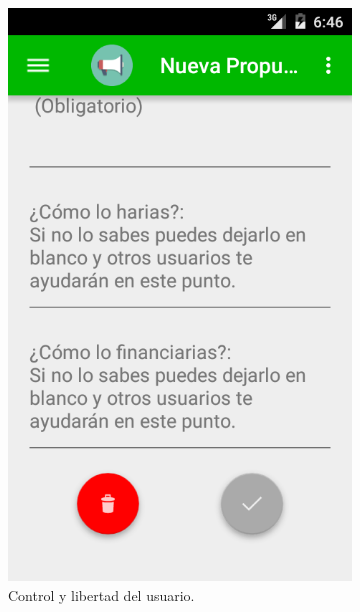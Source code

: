 \begin{figure}[!]
\begin{subfigure}[b]{0.3\textwidth}
                \includegraphics[width=\textwidth]{Media/Captures/principio03.png}
                \caption{Control y libertad del usuario.}
                \label{fig:quipText}
        \end{subfigure}
        ~
        \begin{subfigure}[b]{0.3\textwidth}

\end{subfigure}
\end{figure}
